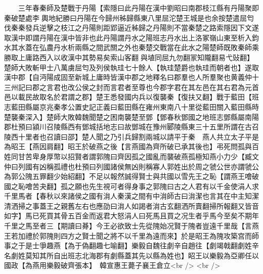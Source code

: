　　三年春秦師及楚戰于丹陽【索隱曰此丹陽在漢中劉昭曰南郡枝江縣有丹陽聚即秦破楚處李輿地紀勝曰丹陽在今歸州秭歸縣東八里屈沱楚王城是也余按楚遣屈匄伐秦秦發兵逆擊之枝江之丹陽則距郢逼近秭歸之丹陽則不當秦楚之路索隱因下文遂取漢中即謂丹陽在漢中皆非也此丹陽謂丹水之陽班志丹水出上洛冢嶺山東至析入鈞水其水蓋在弘農丹水析兩縣之間武關之外也秦楚交戰當在此水之陽楚師既敗秦師乘勝取上庸路西入以收漢中其勢易矣索山客翻與埴同屈九勿翻冡知隴翻易弋䜴翻】楚師大敗斬甲士八萬虜屈匄及列侯執珪七十餘人【執珪楚爵也執珪而朝者也】遂取漢中郡【自沔陽成固至新城上庸時皆漢中郡之地釋名曰郡羣也人所羣聚也黄義仲十三州記曰郡之言君也改公侯之封而言君者至尊也今郡字君在其左邑在其右君為元首邑以載民故取名於君謂之郡】楚王悉發國内兵以復襲秦【復扶又翻】戰于藍田【班志藍田縣屬京兆秦孝公置史記正義曰藍田縣在雍州東南八十里從藍田關入藍田縣時楚襲秦深入】楚師大敗韓魏聞楚之困南襲楚至鄧【鄧春秋鄧國之地班志鄧縣屬南陽郡杜預曰潁川召陵縣西有鄧城括地志曰故鄧城在豫州郾陵縣東三十五里所謂在古召陵西十里者也召讀曰邵】楚人聞之乃引兵歸割兩城以請平于秦　燕人共立太子平是為昭王【燕因肩翻】昭王於破燕之後【言燕國為齊所破已承其後也】弔死問孤與百姓同甘苦卑身厚幣以招賢者謂郭隗曰齊因孤之國亂而襲破燕孤極知燕小力少【臧文仲曰列國有凶稱孤禮也杜預曰列國諸侯無凶則稱寡人郭姓出於周之虢公世亦謂虢公為郭公隗五罪翻少始紹翻】不足以報然誠得賢士與共國以雪先王之恥【謂燕王噲破國之恥噲苦夬翻】孤之願也先生視可者得身事之郭隗曰古之人君有以千金使涓人求千里馬者【春秋以來諸侯之國有㳙人秦漢之間有中㳙師古曰㳙潔也言其在中主知潔清洒掃之事蓋王之親舊左右也應劭曰㳙人如謁者㳙古玄翻洒所賣翻掃所報翻又皆音如字】馬已死買其骨五百金而返君大怒涓人曰死馬且買之况生者乎馬今至矣不期年千里之馬至者三【期讀曰朞】今王必欲致士先從隗始况賢于隗者豈遠千里哉【言燕王若加禮於郭隗則四方之賢士聞之將不以千里為遠而來】於是昭王為隗攻築宫而師事之于是士爭趣燕【為于偽翻趣七喻翻】樂毅自魏往劇辛自趙往【劇竭戟翻劇姓辛名劇姓莫知其所自出班志北海郡有劇縣蓋其先以縣為姓也】眧王以樂毅為亞卿任以國政【為燕用樂毅破齊張本】　韓宣惠王薨子襄王倉立<br />
<br />

